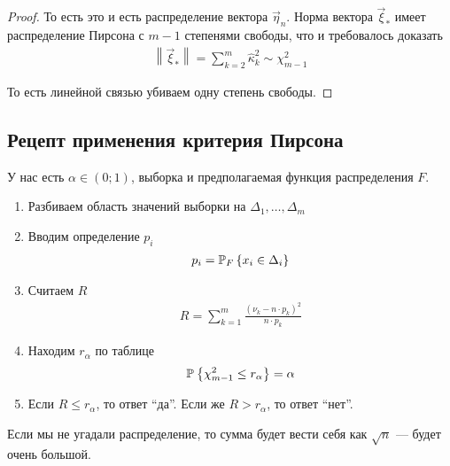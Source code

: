 \begin{proof}
  То есть это и есть распределение вектора $\vec{\eta}_n$. Норма вектора
  $\vec{\xi}_*$ имеет распределение Пирсона с $m-1$ степенями свободы, что и
  требовалось доказать
  \begin{align*}
      \left\| \vec{\xi}_* \right\| = \sum_{k=2}^{m} \hat{\kappa}_k^2
      \sim \chi_{m-1}^2
  \end{align*}

  То есть линейной связью убиваем одну степень свободы.
\end{proof}

\subsection{Рецепт применения критерия Пирсона}
У нас есть $\alpha \in \left( 0; 1 \right)$, выборка \xsample и
предполагаемая функция распределения $F$.

\begin{enumerate}
  \item Разбиваем область значений выборки на $\Delta_1, \dots, \Delta_m$
  \item Вводим определение $p_i$
      \begin{align*}
      p_i = \Probability[F]{x_i \in \Delta_i}
      \end{align*}
  \item Считаем $R$
      \begin{align*}
      R = \sum_{k=1}^{m}\frac{\left( \nu_k - n \cdot p_k \right)^2}{
          n \cdot p_k}
      \end{align*}
  \item Находим $r_{\alpha}$ по таблице
      \begin{align*}
      \Probability{\chi_{m-1}^2 \le r_{\alpha}} = \alpha
      \end{align*}
  \item Если $R \le r_{\alpha}$, то ответ ``да''. Если же $R > r_{\alpha}$,
      то ответ ``нет''.
\end{enumerate}

Если мы не угадали распределение, то сумма будет вести себя как $\sqrt{n}$ ---
будет очень большой.
